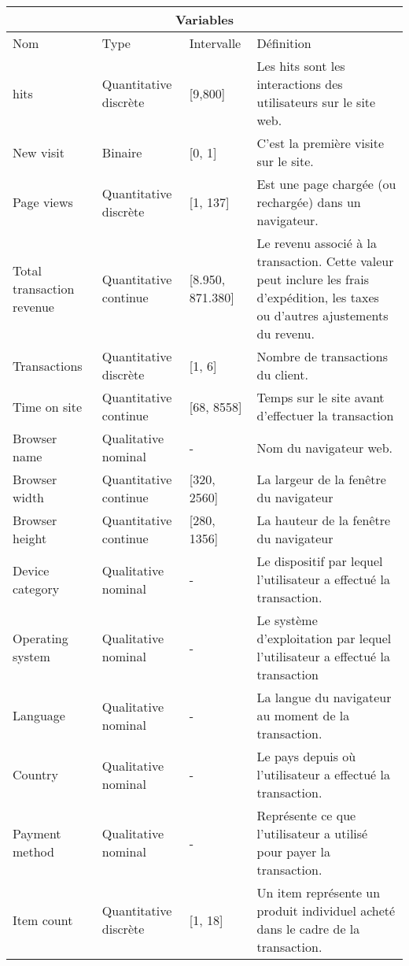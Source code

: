 \documentclass[12pt, a4paper]{article}
\begin{document}
\begin{center}
\begin{longtable}{ |p{3cm}||p{3cm}|p{2cm}|p{5cm}|  }
 \hline
 \multicolumn{4}{|c|}{Variables} \\
 \hline
 Nom & Type &Intervalle&Définition\\
 \hline
 hits   & Quantitative discrète  &[9,800]&  Les hits sont les interactions des utilisateurs sur le site web.\\
New visit &   Binaire   & [0, 1]   & C'est la première visite sur le site.\\
Page views&   Quantitative discrète  & [1, 137]   &Est une page chargée (ou rechargée) dans un navigateur.\\
Total transaction revenue & Quantitative continue  &[8.950, 871.380]&  Le revenu associé à la transaction. Cette valeur peut inclure les frais d'expédition, les taxes ou d'autres ajustements du revenu.\\
Transactions    &Quantitative discrète  & [1, 6] &  Nombre de transactions du client.\\
Time on site&   Quantitative continue  & [68, 8558]& Temps sur le site avant d'effectuer la transaction \\
 Browser name& Qualitative nominal  & -   & Nom du navigateur web.\\
 Browser width& Quantitative continue  & [320, 2560]& La largeur de la fenêtre du navigateur \\
 Browser height& Quantitative continue  & [280, 1356]& La hauteur de la fenêtre du navigateur\\
 Device category& Qualitative nominal   & -&Le dispositif par lequel l'utilisateur a effectué la transaction.\\
 Operating system& Qualitative nominal  & -&Le système d'exploitation par lequel l'utilisateur a effectué la transaction\\
 Language& Qualitative nominal  & -& La langue du navigateur au moment de la transaction.\\
 Country& Qualitative nominal   & -& Le pays depuis où l'utilisateur a effectué la transaction.\\
 Payment method& Qualitative nominal   & -&  Représente  ce que l'utilisateur a utilisé pour payer la transaction.\\
 Item count& Quantitative discrète  & [1, 18]& Un item représente un produit individuel acheté dans le cadre de la transaction. \\
 \hline
\end{longtable}
\end{center}
\end{document}
